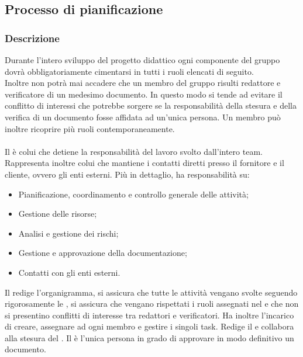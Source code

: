 \subsection{Processo di pianificazione}

\subsubsection{Descrizione}
Durante l'intero sviluppo del progetto didattico ogni componente del gruppo 
dovrà obbligatoriamente cimentarsi in tutti i ruoli elencati di seguito. \\
Inoltre non potrà mai accadere che un membro del gruppo risulti redattore e verificatore di un medesimo documento. 
In questo modo si tende ad evitare il conflitto di interessi che potrebbe sorgere se la responsabilità della stesura 
e della verifica di un documento fosse affidata ad un'unica persona.
Un membro può inoltre ricoprire più ruoli contemporaneamente.

\paragraph{\RdP}
Il \textsl{\RdP} è colui che detiene la responsabilità del 
lavoro svolto dall'intero team. Rappresenta inoltre colui che mantiene i 
contatti diretti presso il fornitore e il cliente, ovvero gli enti esterni. Più 
in dettaglio, ha responsabilità su:
\begin{itemize}
  \item Pianificazione, coordinamento e controllo generale delle attività;
  \item Gestione delle risorse;
  \item Analisi e gestione dei rischi;
  \item Gestione e approvazione della documentazione;
  \item Contatti con gli enti esterni.
\end{itemize}
Il \textsl{\RdP} redige l'organigramma, si assicura che 
tutte le attività vengano svolte seguendo rigorosamente le \textsl{\NdP}, si 
assicura che vengano rispettati i ruoli assegnati nel \textsl{\PdP} e che non si 
presentino conflitti di interesse tra redattori e verificatori. Ha inoltre 
l'incarico di creare, assegnare ad ogni membro e gestire i singoli task. Redige 
il \textsl{\PdP} e collabora alla stesura del \textsl{\PdQ}. Il \textsl{\RdP} è 
l'unica persona in grado di approvare in modo definitivo un documento.

